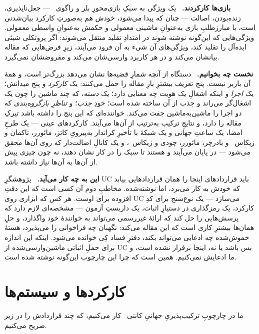 \documentclass[10pt,oneside,openany]{book}
\newcommand{\heading}[1]{\medskip\par\noindent\textcolor{accent}{\textbf{#1.}}\ }
\theoremstyle{accentdef}
\theoremstyle{accentplain}
\begin{document}
\heading{بازی‌ها کارکردند} یک ویژگی به سبکِ بازی‌محورِ بلر و
راگوی~\cite{BR06} --- جعل‌ناپذیری، زنده‌بودن، اصالت --- چنان که پیدا
می‌شود، خودش هم به‌صورتِ کارکرد بیان‌شدنی است، با مبارزطلبِ بازی به‌عنوانِ
ماشینی معمولی و حکمش به‌عنوانِ واسطی معمولی. ویژگی‌هایی که این‌گونه نوشته
شوند در امتدادِ تقلید منتقل می‌شوند: اگر پروتکلی شیئی ایده‌آل را تقلید کند،
ویژگی‌های آن شیء به آن فرود می‌آیند، زیرِ فرض‌هایی که مقاله بیانشان می‌کند
و در هر کاربرد وارسی‌شان می‌کند و مفروضشان نمی‌گیرد.

\heading{نخست چه بخوانیم} دستگاه از آنچه شمارِ قضیه‌ها نشان می‌دهد
بزرگ‌تر است، و همهٔ آن باربر نیست. پنج تعریف بیشترِ بارِ مقاله را حمل
می‌کنند: یک \emph{کارکرد} و پنج میدانش؛ یک \emph{اجرا} و اینکه اشغالِ یک
هویت چه معنایی دارد؛ یک \emph{دسته}، که چند ماشین را چون یک اشغال‌گر
می‌راند و جذب از آن ساخته شده است؛ خودِ \emph{جذب}؛ و \emph{تناظرِ
بازگروه‌بندی} که دو اجرا را ماشین‌به‌ماشین جفت می‌کند. خواننده‌ای که این
پنج را داشته باشد تیرکِ مقاله را دارد، و نتایجِ ترکیب به‌ترتیب از آن‌ها
می‌آیند. کارکردهای عینی --- یک طرحِ امضا، یک ساعتِ جهانی و یک شبکهٔ با
تأخیرِ کراندار به‌پیرویِ کاتز، مائورر، تاکمان و زیکاس~\cite{KMTZ13} و
بادرچر، مائورر، چودی و زیکاس~\cite{BMTZ17}، و یک کانالِ اصالت‌دار که روی
آن‌ها محقق می‌شود --- در پایان می‌آیند و هستند تا سبک را در کار نشان
دهند، نه چون چیزی پیش از آن‌ها به آن‌ها نیاز داشته باشد.

\heading{این به چه کار می‌آید} پژوهشگرِ UC باید قراردادهای اینجا را همان
قراردادهایی بیابد که خودش به کار می‌برد، اما نوشته‌شده. مخاطبِ دوم آن کسی
است که این دقتِ افزوده برای اوست. هر کس که ابزاری روی UC می‌سازد --- یک
نوع‌سنج برای کدِ کارکرد، یک رمزگذاری در دستیارِ اثبات، یک داربستِ آزمون ---
مشخصه‌ای لازم دارد که پرسش‌هایی را حل کند که ارائهٔ غیررسمی می‌تواند به
خوانندهٔ خود واگذارد، و حلِ همان‌ها بیشترِ کاری است که این مقاله می‌کند:
نگهبان چه فراخوانی را می‌پذیرد، هستهٔ خموش‌شده چه ادعایی می‌تواند بکند،
دفترِ فساد کِی خوانده می‌شود. اینکه این اندازه برای حملِ اثباتی
ماشین‌وارسی‌شده از UC بس باشد یا نه، اینجا برقرار نشده است، و ما ادعایش
نمی‌کنیم. همین است که چرا این چارچوب این‌گونه نوشته شده است.

\chapter{کارکردها و سیستم‌ها}\label{sec:functionalities}

ما در چارچوبِ ترکیب‌پذیریِ جهانیِ کانتی~\cite{Canetti20} کار می‌کنیم، که
چند قراردادش را در زیر صریح می‌کنیم.
\end{document}
